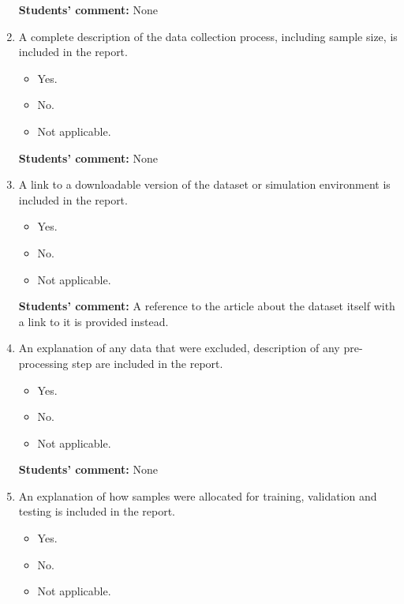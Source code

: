 \documentclass{article}
\begin{document}
\begin{enumerate}
    \textbf{Students' comment:} None
    
    \item A complete description of the data collection process, including sample size, is included in the report.
    \begin{itemize}
        \item [\faCheckSquareO] Yes.
        \item [\faSquareO] No.
        \item [\faSquareO] Not applicable.
    \end{itemize}
    
    \textbf{Students' comment:} None
    
    \item A link to a downloadable version of the dataset or simulation environment is included in the report.
    \begin{itemize}
        \item [\faSquareO] Yes.
        \item [\faCheckSquareO] No.
        \item [\faSquareO] Not applicable.
    \end{itemize}
    
    \textbf{Students' comment:} A reference to the article \cite{DataSet} about the dataset itself with a link to it is provided instead.
    
    \item An explanation of any data that were excluded, description of any pre-processing step are included in the report.
    \begin{itemize}
        \item [\faCheckSquareO] Yes.
        \item [\faSquareO] No.
        \item [\faSquareO] Not applicable.
    \end{itemize}
    
    \textbf{Students' comment:} None
    
    \item An explanation of how samples were allocated for training, validation and testing is included in the report.
    \begin{itemize}
        \item [\faCheckSquareO] Yes.
        \item [\faSquareO] No.
        \item [\faSquareO] Not applicable.
    \end{itemize}
    

\end{enumerate}
\end{document}
